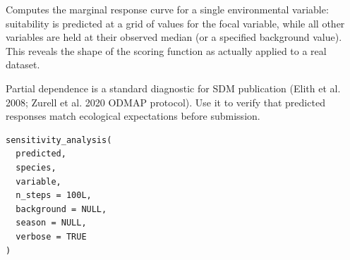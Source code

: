 \documentclass[a4paper]{book}
\begin{document}
%
\begin{Examples}
\end{Examples}
%
\begin{Description}
Computes the marginal response curve for a single environmental variable:
suitability is predicted at a grid of values for the focal variable, while
all other variables are held at their observed median (or a specified
background value). This reveals the shape of the scoring function as
actually applied to a real dataset.

Partial dependence is a standard diagnostic for SDM publication (Elith et al.
2008; Zurell et al. 2020 ODMAP protocol). Use it to verify that predicted
responses match ecological expectations before submission.
\end{Description}
%
\begin{Usage}
\begin{verbatim}
sensitivity_analysis(
  predicted,
  species,
  variable,
  n_steps = 100L,
  background = NULL,
  season = NULL,
  verbose = TRUE
)
\end{verbatim}
\end{Usage}
%
\end{document}

